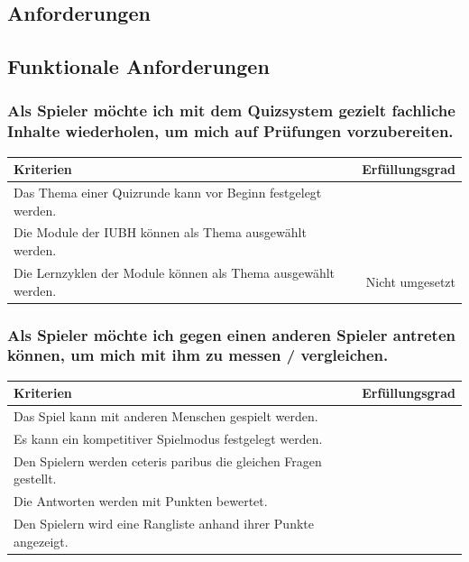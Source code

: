 \documentclass[a4paper,11pt,listof=numbered,glossary=totoc,parskip=half,toc=bib]{scrreprt}
\begin{document}
	\begin{appendices}
	\renewcommand{\appendixtocname}{Anhang}
	\renewcommand{\appendixpagename}{Anhang}
	\appendixpage	
	\addappheadtotoc
	\chapter{Anforderungen}	
		
		\section{Funktionale Anforderungen}
		
	\subsection{Als Spieler möchte ich mit dem Quizsystem gezielt fachliche Inhalte wiederholen, um mich auf
Prüfungen vorzubereiten.}

		\begin{tabularx}{\textwidth}{Xr}
			
			Kriterien & Erfüllungsgrad \\
			\midrule
		Das Thema einer Quizrunde kann vor Beginn festgelegt werden. & \\
		Die Module der IUBH können als Thema ausgewählt werden. & \\
		Die Lernzyklen der Module können als Thema ausgewählt werden. & Nicht umgesetzt \\
			\bottomrule
		\end{tabularx}		
		
		\subsection{Als Spieler möchte ich gegen einen anderen Spieler antreten können, um mich mit ihm zu messen /
vergleichen.}

		\begin{tabularx}{\textwidth}{Xr}
			
			Kriterien & Erfüllungsgrad \\
			\midrule
		Das Spiel kann mit anderen Menschen gespielt werden. & \\
		Es kann ein kompetitiver Spielmodus festgelegt werden. & \\
		Den Spielern werden ceteris paribus die gleichen Fragen gestellt. & \\		
		Die Antworten werden mit Punkten bewertet. & \\
		Den Spielern wird eine Rangliste anhand ihrer Punkte angezeigt. & \\
			\bottomrule
		\end{tabularx}	
		

\end{appendices}
\end{document}
